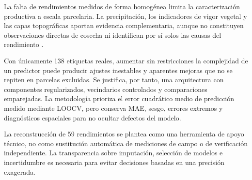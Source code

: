 La falta de rendimientos medidos de forma homogénea limita la caracterización productiva a escala parcelaria. La precipitación, los indicadores de vigor vegetal y las capas topográficas aportan evidencia complementaria, aunque no constituyen observaciones directas de cosecha ni identifican por sí solos las causas del rendimiento \parencite{Sharifi2020,Holland2021,Bokusheva2016,Serban2025}.

Con únicamente 138 etiquetas reales, aumentar sin restricciones la complejidad de un predictor puede producir ajustes inestables y aparentes mejoras que no se repiten en parcelas excluidas. Se justifica, por tanto, una arquitectura con componentes regularizados, vecindarios controlados y comparaciones emparejadas. La metodología prioriza el error cuadrático medio de predicción medido mediante LOOCV, pero conserva MAE, sesgo, errores extremos y diagnósticos espaciales para no ocultar defectos del modelo.

La reconstrucción de 59 rendimientos se plantea como una herramienta de apoyo técnico, no como sustitución automática de mediciones de campo o de verificación independiente. La transparencia sobre imputación, selección de modelos e incertidumbre es necesaria para evitar decisiones basadas en una precisión exagerada.
